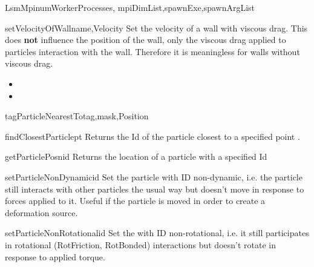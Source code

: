 \documentclass{manual}
\begin{document}
\begin{classdesc}{LsmMpi}{numWorkerProcesses, mpiDimList,spawnExe,spawnArgList}
\begin{methoddesc}{setVelocityOfWall}{name,Velocity}
Set the velocity of a wall with viscous drag. This does {\bf not} influence the position of the wall, only the viscous drag applied to particles interaction with the wall. Therefore it is meaningless for walls without viscous drag.
\begin{itemize}
\item {}
\item {}
\end{itemize}
\end{methoddesc}

\begin{methoddesc}{tagParticleNearestTo}{tag,mask,Position}

\end{methoddesc}

\begin{methoddesc}{findClosestParticle}{pt}
Returns the Id of the particle closest to a specified point .
\end{methoddesc}

\begin{methoddesc}{getParticlePosn}{id}
Returns the location of a particle with a specified Id 
\end{methoddesc}

\begin{methoddesc}{setParticleNonDynamic}{id}
Set the particle with ID  non-dynamic, i.e. the particle still interacts with other particles the usual way but doesn't move in response to forces applied to it. Useful if the particle is moved in order to create a deformation source.
 
\end{methoddesc}

\begin{methoddesc}{setParticleNonRotational}{id}
Set the with ID  non-rotational, i.e. it still participates in rotational (RotFriction, RotBonded) interactions but doesn't rotate in response to applied torque.  
\end{methoddesc}



\end{classdesc}
\end{document}
